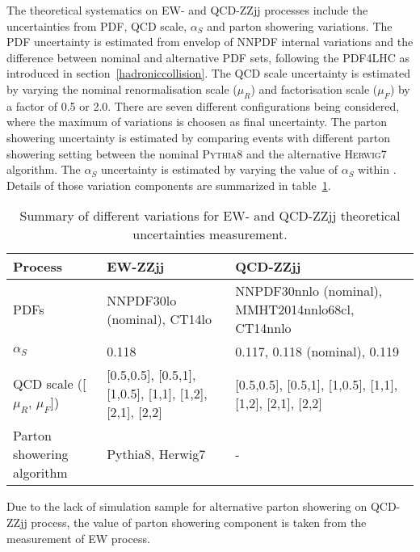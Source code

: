The theoretical systematics on EW- and QCD-ZZjj processes include the uncertainties from PDF, QCD scale, $\alpha_{S}$ and parton showering variations.
The PDF uncertainty is estimated from envelop of NNPDF internal variations and the difference between nominal and alternative PDF sets, following the PDF4LHC as introduced in section~\ref{hadroniccollision}.
The QCD scale uncertainty is estimated by varying the nominal renormalisation scale ($\mu_{R}$) and factorisation scale ($\mu_{F}$) by a factor of 0.5 or 2.0.
There are seven different configurations being considered, where the maximum of variations is choosen as final uncertainty.
The parton showering uncertainty is estimated by comparing events with different parton showering setting between the nominal \textsc{Pythia8} and the alternative \textsc{Herwig7}\cite{Bellm:2015jjp, Bahr:2008pv} algorithm.
The $\alpha_{S}$ uncertainty is estimated by varying the value of $\alpha_{S}$ within .
Details of those variation components are summarized in table~\ref{tab:syst_theo_uncer}.
\begin{table}[!htb]
\small
\begin{center}
\begin{tabular}{p{5cm}p{5cm}p{5cm}} 
\hline\hline
Process     & EW-ZZjj   & QCD-ZZjj \\
\hline
PDFs        & NNPDF30lo (nominal), CT14lo & NNPDF30nnlo (nominal), MMHT2014nnlo68cl, CT14nnlo \\
\hline
$\alpha_{S}$ & 0.118 & 0.117, 0.118 (nominal), 0.119 \\
\hline
QCD scale ([$\mu_{R}$, $\mu_{F}$]) & [0.5,0.5], [0.5,1], [1,0.5], [1,1], [1,2], [2,1], [2,2] & [0.5,0.5], [0.5,1], [1,0.5], [1,1], [1,2], [2,1], [2,2] \\
\hline 
Parton showering algorithm & Pythia8, Herwig7 & - \\
\hline\hline
\end{tabular}
\caption{
Summary of different variations for EW- and QCD-ZZjj theoretical uncertainties measurement.
}
\label{tab:syst_theo_uncer}
\end{center}
\end{table}
Due to the lack of simulation sample for alternative parton showering on QCD-ZZjj process, 
the value of parton showering component is taken from the measurement of EW process.

